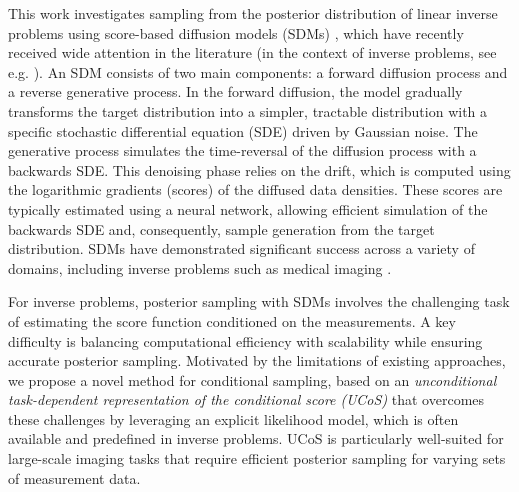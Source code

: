 \documentclass[10pt]{article} %
\theoremstyle{plain}
\theoremstyle{definition}
\theoremstyle{remark}
\begin{document}
This work investigates sampling from the posterior distribution of linear inverse problems using score-based diffusion models (SDMs) \cite{song2021scorebasedDiffusion}, which have recently received wide attention in the literature (in the context of inverse problems, see e.g. \citet{batzolis2021conditional, lim2023score, hagemann2023multilevel, graikos2023diffusionplugandplay, feng2023scorebased, sun2023provable, pidstrigach2023infinitedimensional, Dey_2024, holzschuh2023solving, dou2023diffusion, barbano2023steerable, cardoso2023monte, feng2023efficient, song2024solving, meng2022diffusion, kveton2024online, wu2024practical, wu2024principled, baldassari2024taming, yao2025guideddiffusionsamplingfunction, chen2025solvinginverseproblemsdiffusionbased}). 
An SDM consists of two main components: a forward diffusion process and a reverse generative process. In the forward diffusion, the model gradually transforms the target distribution into a simpler, tractable distribution with a specific stochastic differential equation (SDE) driven by Gaussian noise. The generative process simulates the time-reversal of the diffusion process with a backwards SDE. This denoising phase relies on the drift, which is computed using the logarithmic gradients (scores) of the diffused data densities. These scores are typically estimated using a neural network, allowing efficient simulation of the backwards SDE and, consequently, sample generation from the target distribution. SDMs have demonstrated significant success across a variety of domains, including inverse problems such as medical imaging \cite{Dey_2024, levac2023mri, barbano2023steerable, chung2023solving, song2022solving}.

For inverse problems, posterior sampling with SDMs involves the challenging task of estimating the score function conditioned on the measurements. A key difficulty is balancing computational efficiency with scalability while ensuring accurate posterior sampling. Motivated by the limitations of existing approaches, we propose a novel method for conditional sampling, based on an \emph{unconditional task-dependent representation of the conditional score (UCoS)} that overcomes these challenges by leveraging an explicit likelihood model, which is often available and predefined in inverse problems. UCoS is particularly well-suited for large-scale imaging tasks that require efficient posterior sampling for varying sets of measurement data.
\end{document}
